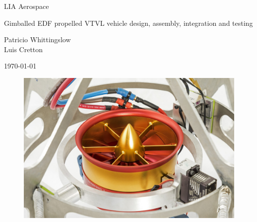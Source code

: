 \documentclass[11pt, titlepage]{article}
\author{Patricio Whittingslow \and Luis Cretton}
\begin{document}
\begin{titlepage}
	
	\centering
	{\small LIA Aerospace \par}
	
	
	\vspace{3cm}
	{\Huge Gimballed EDF propelled VTVL vehicle design, assembly, integration and testing \par}
	\vspace{2cm}
	{ \large {
			Patricio Whittingslow \\ Luis Cretton 
		\par}}
	\vspace{1cm}
	\today
	\vspace{3cm}
	\begin{figure}[htb]
		\centering
		\includegraphics[width=\linewidth]{fig/hq/gimbal_close.jpg}
	\end{figure}
\end{titlepage}
\end{document}
